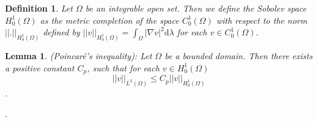 \documentclass[11pt,a4paper,leqno]{report}
\newtheorem{lemma}[theorem]{Lemma}
\newtheorem{definition}[theorem]{Definition}
\numberwithin{equation}{chapter}
\begin{document}
\begin{definition} Let $\Omega$ be an integrable open set. Then we define the Sobolev space $H^1_0(\Omega)$ as the metric completion of the space $C^1_0(\Omega)$ with respect to the norm $||.||_{H^1_0(\Omega)}$ defined by $||v||_{H^1_0(\Omega)}=\int_\Omega |\nabla v|^2 \mathrm{d}\lambda$ for each $v\in C^1_0(\Omega)$.\end{definition}

\begin{lemma}(Poincar\'{e}'s inequality): Let $\Omega$ be a bounded domain. Then there exists a positive constant $C_p$, such that for each $v\in H^1_0(\Omega)$ 
\begin{equation}||v||_{L^2(\Omega)}\leq C_p ||v||_{H^1_0(\Omega)}\end{equation} \cite{Wang}.\end{lemma}.
\end{document}

